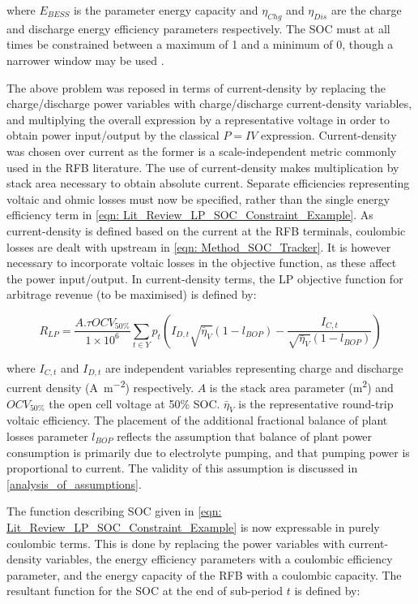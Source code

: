 \documentclass[preprint,3p,review,authoryear,10pt]{elsarticle}
\begin{document}
where $E_{BESS}$ is the parameter energy capacity and $\eta_{Chg}$ and $\eta_{Dis}$ are the charge and discharge energy efficiency parameters respectively. The SOC must at all times be constrained between a maximum of 1 and a minimum of 0, though a narrower window may be used \cite{Vaca2017}.

The above problem was reposed in terms of current-density by replacing the charge/discharge power variables with charge/discharge current-density variables, and multiplying the overall expression by a representative voltage in order to obtain power input/output by the classical $P = IV$ expression. Current-density was chosen over current as the former is a scale-independent metric commonly used in the RFB literature. The use of current-density makes multiplication by stack area necessary to obtain absolute current. Separate efficiencies representing voltaic and ohmic losses must now be specified, rather than the single energy efficiency term in \cref{eqn: Lit_Review_LP_SOC_Constraint_Example}. As current-density is defined based on the current at the RFB terminals, coulombic losses are dealt with upstream in \cref{eqn: Method_SOC_Tracker}. It is however necessary to incorporate voltaic losses in the objective function, as these affect the power input/output.  In current-density terms, the LP objective function for arbitrage revenue (to be maximised) is defined by:


\begin{equation}
\label{eqn: Linear_Schedule_Objective_Function_Current_as_Variable}
R_{LP} = \frac{A.\tau OCV_{50\%}}{1\times 10^{6}}\sum_{t \in Y}p_{t}(I_{D, t}\sqrt{\bar\eta_{V}}(1 - l_{BOP}) - \frac{I_{C,t}}{\sqrt{\bar\eta_{V}}(1 - l_{BOP})})
\end{equation}

where $I_{C,t}$ and $I_{D,t}$ are independent variables representing charge and discharge current density (\si{\ampere\per\square\meter}) respectively. $A$ is the stack area parameter (\si{\square\meter}) and $OCV_{50\%}$ the open cell voltage at 50\% SOC. $\bar\eta_{V}$ is the representative round-trip voltaic efficiency. The  placement of the additional fractional balance of plant losses parameter $l_{BOP}$ reflects the assumption that balance of plant power consumption is primarily due to electrolyte pumping, and that pumping power is proportional to current. The validity of this assumption is discussed in \cref{analysis_of_assumptions}. 

The function describing SOC given in \cref{eqn: Lit_Review_LP_SOC_Constraint_Example} is now expressable in purely coulombic terms. This is done by replacing the power variables with current-density variables, the energy efficiency parameters with a coulombic efficiency parameter, and the energy capacity of the RFB with a coulombic capacity. The resultant function for the SOC at the end of sub-period $t$ is defined by:
\end{document}
